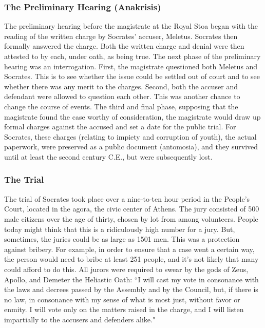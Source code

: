 \subsubsection{The Preliminary Hearing (Anakrisis)}

The preliminary hearing before the magistrate at the Royal Stoa began with the reading of the written charge by Socrates' accuser, Meletus. Socrates then formally answered the charge. Both the written charge and denial were then attested to by each, under oath, as being true. The next phase of the preliminary hearing was an interrogation. First, the magistrate questioned both Meletus and Socrates. This is to see whether the issue could be settled out of court and to see whether there was any merit to the charges. Second, both the accuser and defendant were allowed to question each other. This was another chance to change the course of events. The third and final phase, supposing that the magistrate found the case worthy of consideration, the magistrate would draw up formal charges against the accused and set a date for the public trial. For Socrates, these charges (relating to impiety and corruption of youth), the actual paperwork, were preserved as a public document (antomosia), and they survived until at least the second century C.E., but were subsequently lost. 
\subsubsection{The Trial}

The trial of Socrates took place over a nine‐to‐ten hour period in the People's Court, located in the agora, the civic center of Athens. The jury consisted of 500 male citizens over the age of thirty, chosen by lot from among volunteers. People today might think that this is a ridiculously high number for a jury.  But, sometimes, the juries could be as large as 1501 men. This was a protection against bribery. For example, in order to ensure that a case went a certain way, the person would need to bribe at least 251 people, and it's not likely that many could afford to do this.  All jurors were required to swear by the gods of Zeus, Apollo, and Demeter the Heliastic Oath: ``I will cast my vote in consonance with the laws and decrees passed by the Assembly and by the Council, but, if there is no law, in consonance with my sense of what is most just, without favor or enmity. I will vote only on the matters raised in the charge, and I will listen impartially to the accusers and defenders alike."

